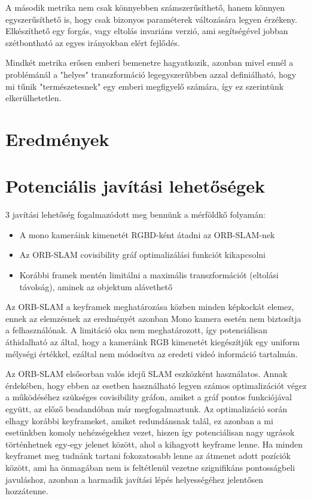 A második metrika nem csak könnyebben számszerűsíthető, hanem könnyen egyszerűsíthető is, hogy csak bizonyos paraméterek változására legyen érzékeny.
Elkészíthető egy forgás, vagy eltolás invariáns verzió, ami segítségével jobban szétbontható az egyes irányokban elért fejlődés.

Mindkét metrika erősen emberi bemenetre hagyatkozik, azonban mivel ennél a problémánál a "helyes" transzformáció legegyszerűbben azzal definiálható, hogy mi tűnik "természetesnek" egy emberi megfigyelő számára, így ez szerintünk elkerülhetetlen.

\section{Eredmények}

\section{Potenciális javítási lehetőségek}

3 javítási lehetőség fogalmazódott meg bennünk a mérföldkő folyamán:
\begin{itemize}
	\item A mono kameráink kimenetét RGBD-ként átadni az ORB-SLAM-nek
	\item Az ORB-SLAM covisibility gráf optimalizálási funkciót kikapcsolni
	\item Korábbi framek mentén limitálni a maximális transzformációt (eltolási távolság), aminek az objektum alávethető
\end{itemize}

Az ORB-SLAM a keyframek meghatározása közben minden képkockát elemez, ennek az elemzésnek az eredményét azonban Mono kamera esetén nem biztosítja a felhasználónak.
A limitáció oka nem meghatározott, így potenciálisan áthidalható az által, hogy a kameráink RGB kimenetét kiegészítjük egy uniform mélységi értékkel, ezáltal nem módosítva az eredeti videó információ tartalmán.

Az ORB-SLAM elsősorban valós idejű SLAM eszközként használatos.
Annak érdekében, hogy ebben az esetben használható legyen számos optimalizációt végez a működéséhez szükséges covisibility gráfon, amiket a gráf pontos funkciójával együtt, az előző beadandóban már megfogalmaztunk.
Az optimalizáció során elhagy korábbi keyframeket, amiket redundánsnak talál, ez azonban a mi esetünkben komoly nehézségekhez vezet, hiszen így potenciálisan nagy ugrások történhetnek egy-egy jelenet között, ahol a kihagyott keyframe lenne.
Ha minden keyframet meg tudnánk tartani fokozatosabb lenne az átmenet adott pozíciók között, ami ha önmagában nem is feltétlenül vezetne szignifikáns pontosságbeli javuláshoz, azonban a harmadik javítási lépés helyességéhez jelentősen hozzátenne.

